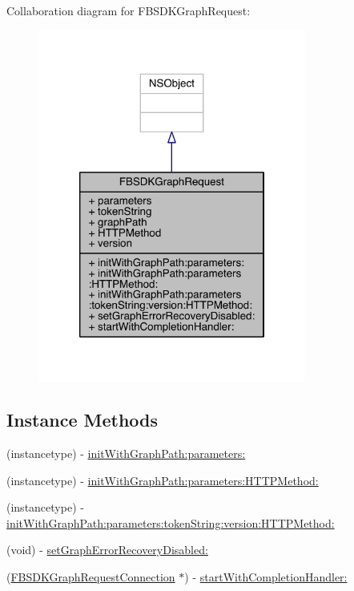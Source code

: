 Collaboration diagram for F\-B\-S\-D\-K\-Graph\-Request\-:
\nopagebreak
\begin{figure}[H]
\begin{center}
\leavevmode
\includegraphics[width=250pt]{interface_f_b_s_d_k_graph_request__coll__graph}
\end{center}
\end{figure}
\subsection*{Instance Methods}
\begin{DoxyCompactItemize}
\item 
(instancetype) -\/ \hyperlink{interface_f_b_s_d_k_graph_request_a0d2545a6264377a1f51aec7da411c0f6}{init\-With\-Graph\-Path\-:parameters\-:}
\item 
(instancetype) -\/ \hyperlink{interface_f_b_s_d_k_graph_request_a20fe5c18d67699e74e9596058552aa6a}{init\-With\-Graph\-Path\-:parameters\-:\-H\-T\-T\-P\-Method\-:}
\item 
(instancetype) -\/ \hyperlink{interface_f_b_s_d_k_graph_request_a1ab42a8e70025f6f6c6c61b31c35480f}{init\-With\-Graph\-Path\-:parameters\-:token\-String\-:version\-:\-H\-T\-T\-P\-Method\-:}
\item 
(void) -\/ \hyperlink{interface_f_b_s_d_k_graph_request_aa1a0db7fc5b93d4014fb9922580a02eb}{set\-Graph\-Error\-Recovery\-Disabled\-:}
\item 
(\hyperlink{interface_f_b_s_d_k_graph_request_connection}{F\-B\-S\-D\-K\-Graph\-Request\-Connection} $\ast$) -\/ \hyperlink{interface_f_b_s_d_k_graph_request_a72aac56d84e54366ae37cbc05353fcc0}{start\-With\-Completion\-Handler\-:}
\end{DoxyCompactItemize}
